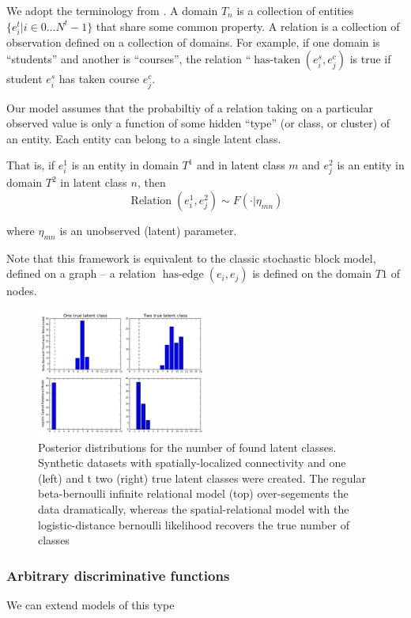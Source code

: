 \documentclass{article}
\begin{document}
We adopt the terminology from \autocite{Kemp2006a}. A domain $T_n$ is a
collection of entities $\{e^t_i | i \in 0 \dots N^t -1 \} $ that share
some common property. A relation is a collection of observation
defined on a collection of domains. For example, if one domain is
``students'' and another is ``courses'', the relation
``$\operatorname{has-taken}(e^s_i, e^c_j)$ is true if student $e^s_i$ has
taken course $e^c_j$. 

Our model assumes that the probabiltiy of a relation taking on a
particular observed value is only a function of some hidden ``type''
(or class, or cluster) of an entity. Each entity can belong to a
single latent class.

That is, if $e^1_i$ is an entity
in domain $T^1$ and in latent class $m$ and $e^2_j$ is an entity in
domain $T^2$ in latent class $n$, then 
\begin{equation}
\operatorname{Relation}(e^1_i, e^2_j) \sim F(\cdot | \eta_{mn})
\end{equation}

where $\eta_{mn}$ is an unobserved (latent) parameter.

Note that this framework is equivalent to the classic stochastic block
model, defined on a graph -- a relation $\operatorname{has-edge}(e_i,
e_j)$ is defined on the domain $T1$ of nodes. 

\begin{figure}
  \centering
  \includegraphics[width=0.5\textwidth]{comparison.pdf}
  \caption{Posterior distributions for the number of found latent classes. Synthetic datasets with spatially-localized connectivity and one (left) and t two (right) true latent classes were created. The regular beta-bernoulli infinite relational model (top) over-segements the data dramatically, whereas the spatial-relational model with the logistic-distance bernoulli likelihood recovers the true number of classes}
\end{figure}
  

\subsubsection{Arbitrary discriminative functions}
We can extend models of this type 
\end{document}
